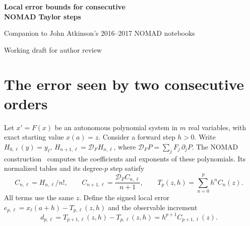\documentclass[11pt,letterpaper]{article}
\newcommand{\F}{\mathcal D_F}
\begin{document}
\begin{center}
{\LARGE\bfseries Local error bounds for consecutive\\[.12em] NOMAD Taylor steps\par}
\vspace{.65em}
{\large Companion to John Atkinson's 2016--2017 NOMAD notebooks\par}
\vspace{.2em}
{\small Working draft for author review\par}
\end{center}
\begin{abstract}
Two consecutive NOMAD steps, taken from the same state, differ by one
explicitly computable Taylor term. We enclose the error of the lower-order
step in a signed interval centered at that difference. The radius comes from
one further normalized derivative polynomial on a box containing the
solution. A strict inequality on the field coefficients verifies the box.
Both endpoints can be computed rationally for a polynomial system with
binary floating-point data, including the correction for rounding in the
returned solver values. Lean checks the derivation and a concrete numerical
enclosure. An example with a vanishing increment shows why the additional
derivative is necessary for this guarantee.
\end{abstract}

\section{The error seen by two consecutive orders}
Let \(x'=F(x)\) be an autonomous polynomial system in \(m\) real variables,
with exact starting value \(x(a)=z\). Consider a forward step \(h>0\).
Write \(H_{0,\ell}(y)=y_\ell\), \(H_{n+1,\ell}=\F H_{n,\ell}\), where
\(\F P=\sum_j F_j\,\partial_j P\). The NOMAD construction~\cite{notebook}
computes the coefficients and exponents of these polynomials. Its normalized
tables and its degree-\(p\) step satisfy
\begin{equation}\label{eq:step}
 C_{n,\ell}=H_{n,\ell}/n!,\qquad C_{n+1,\ell}=\frac{\F C_{n,\ell}}{n+1},
 \qquad T_p(z,h)=\sum_{n=0}^{p}h^n C_n(z).
\end{equation}
All terms use the same \(z\). Define the signed local error
\(e_{p,\ell}=x_\ell(a+h)-T_{p,\ell}(z,h)\) and the observable increment
\begin{equation}\label{eq:delta}
 d_{p,\ell}=T_{p+1,\ell}(z,h)-T_{p,\ell}(z,h)
             =h^{p+1}C_{p+1,\ell}(z).
\end{equation}
\end{document}
